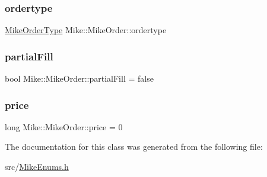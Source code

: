 \subsubsection{\texorpdfstring{ordertype}{ordertype}}
{\footnotesize\ttfamily \hyperlink{namespace_mike_aa486aea8b1d0d07190982a311394e6cb}{Mike\+Order\+Type} Mike\+::\+Mike\+Order\+::ordertype}

\mbox{\label{class_mike_1_1_mike_order_af03e7280847c51ac707e60727474b390}} 
\subsubsection{\texorpdfstring{partial\+Fill}{partialFill}}
{\footnotesize\ttfamily bool Mike\+::\+Mike\+Order\+::partial\+Fill = false}

\mbox{\label{class_mike_1_1_mike_order_a134e751155f6f3c72c9cd600a9865d8f}} 
\subsubsection{\texorpdfstring{price}{price}}
{\footnotesize\ttfamily long Mike\+::\+Mike\+Order\+::price = 0}



The documentation for this class was generated from the following file\+:\begin{DoxyCompactItemize}
\item 
src/\hyperlink{_mike_enums_8h}{Mike\+Enums.\+h}\end{DoxyCompactItemize}
